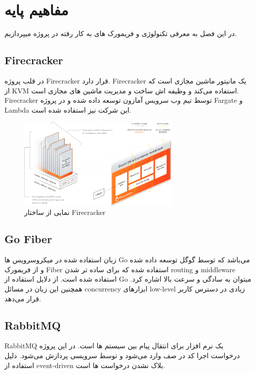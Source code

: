 \chapter{مفاهیم پایه}

در این فصل به معرفی تکنولوژی و فریمورک های به کار رفته در پروژه میپردازیم.

\section{Firecracker}
در قلب پروژه Firecracker قرار دارد. Firecracker یک مانیتور ماشین مجازی است که از KVM استفاده می‌کند و
وظیفه اش ساخت و مدیریت ماشین های مجازی است.
Firecracker توسط تیم وب سرویس آمازون توسعه داده شده و در پروژه Fargate و Lambda این شرکت نیز استفاده شده است.

\begin{figure}[h]
    \centering
    \includegraphics[width=0.7\textwidth]{./2-Basic-Concepts/firecracker-diagram.png}
    \caption{نمایی از ساختار Firecracker}
    \label{fig:firecracker}
\end{figure}

\section{Go Fiber}
زبان استفاده شده در میکروسرویس ها Go می‌باشد که توسط گوگل توسعه داده شده و از فریمورک Fiber استفاده شده که برای ساده تر شدن routing و middleware استفاده شده است.
از دلایل استفاده از Go میتوان به سادگی و سرعت بالا اشاره کرد. همچنین این زبان در مسائل concurrency ابزارهای low-level زیادی در دسترس کاربر قرار می‌دهد.

\section{RabbitMQ}
RabbitMQ یک نرم افزار برای انتقال پیام بین سیستم ها است.
در این پروژه درخواست اجرا کد در صف وارد می‌شود و توسط سرویسی پردازش می‌شود.
دلیل استفاده از event-driven بلاک نشدن درخواست ها است.

